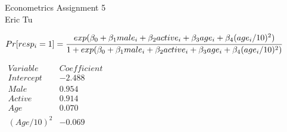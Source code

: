 \documentclass{article}
\begin{document}
\begin{center}
Econometrics Assignment 5 \\
Eric Tu
\end{center}

	$Pr[resp_{i} = 1] = \cfrac{exp(\beta_{0} + \beta_{1} male_{i} + \beta_{2} active_{i} + \beta_{3} age_{i} + \beta_{4}(age_{i}/10)^{2})}{1+exp(\beta_{0} + \beta_{1} male_{i} + \beta_{2} active_{i} + \beta_{3} age_{i} + \beta_{4}(age_{i}/10)^{2})}$ 

	$\begin{matrix}
	Variable & Coefficient \\
	Intercept & -2.488 \\
	Male & 0.954 \\
	Active & 0.914 \\
	Age & 0.070 \\
	(Age/10)^{2} & -0.069 \\
	\end{matrix}$
\end{document}
